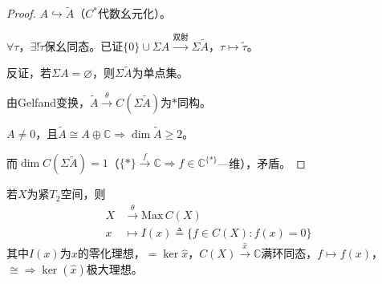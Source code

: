 \documentclass[lang=cn,a4paper,newtx,section]{elegantbook}
\begin{document}
\begin{proof}
  $A \hookrightarrow \tilde{A}$（$C^*$代数幺元化）。
  
  $\forall \tau$，$\exists! \tilde{\tau}$保幺同态。已证$\{0\} \cup \Sigma A \xrightarrow{\text{双射}} \Sigma\tilde{A}$，$\tau \mapsto \tilde{\tau}$。
  
  反证，若$\Sigma A = \varnothing$，则$\Sigma\tilde{A}$为单点集。
  
  由Gelfand变换，$\tilde{A} \xrightarrow{\theta} C(\Sigma\tilde{A})$为$*$同构。
  
  $A \neq 0$，且$\tilde{A} \cong A \oplus \mathbb{C} \Rightarrow \dim\tilde{A} \geq 2$。
  
  而$\dim C(\Sigma\tilde{A}) = 1$（$\{*\} \xrightarrow{f} \mathbb{C} \Rightarrow f \in \mathbb{C}^{\{*\}}$—维），矛盾。
\end{proof}

\begin{theorem}
  若$X$为紧$T_2$空间，则
  \begin{equation*}
    \begin{aligned}
      X &\xrightarrow{\theta} \mathrm{Max}\, C(X) \\
      x &\longmapsto I(x) \triangleq \{f \in C(X) : f(x) = 0\}
    \end{aligned}
  \end{equation*}
  其中$I(x)$为$x$的零化理想，$= \ker\hat{x}$，$C(X) \xrightarrow{\hat{x}} \mathbb{C}$满环同态，$f \mapsto f(x)$，$\cong \Rightarrow \ker(\hat{x})$极大理想。
\end{theorem}
\end{document}

